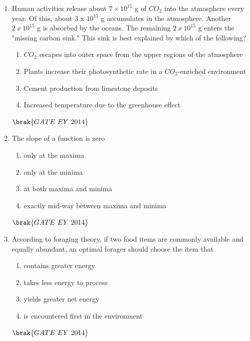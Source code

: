\documentclass[journal]{IEEEtran}
\numberwithin{equation}{enumi}
\numberwithin{figure}{enumi}
\begin{document}
\begin{enumerate}
    \item Human activities release about $7\times10^{15}$ g of $CO_{2}$ into the atmosphere every year. Of this, about 3 x $10^{15}$ g accumulates in the atmosphere. Another $2~x~10^{15}$ g is absorbed by the oceans. The remaining $2~x~10^{15}$ g enters the "missing carbon sink." This sink is best explained by which of the following?
    \begin{enumerate}
        \item $CO_{2}$ escapes into outer space from the upper regions of the atmosphere
        \item Plants increase their photosynthetic rate in a $CO_{2}$-enriched environment
        \item Cement production from limestone deposits
        \item Increased temperature due to the greenhouse effect
    \end{enumerate}
    \hfill{$\brak{ GATE\ EY\ 2014}$}
    \bigskip
    
    \item The slope of a function is zero
    \begin{multicols}{2}
    \begin{enumerate}
        \item only at the maxima
        \item only at the minima
        \item at both maxima and minima
        \item exactly mid-way between maxima and minima
    \end{enumerate}
    \end{multicols}
    \hfill{$\brak{ GATE\ EY\ 2014}$}
    \bigskip

    \item According to foraging theory, if two food items are commonly available and equally abundant, an optimal forager should choose the item that
    \begin{multicols}{2}
    \begin{enumerate}
        \item contains greater energy
        \item takes less energy to process
        \item yields greater net energy
        \item is encountered first in the environment
    \end{enumerate}
    \end{multicols}
    \hfill{$\brak{ GATE\ EY\ 2014}$}
    \bigskip
    

\end{enumerate}
\end{document}
